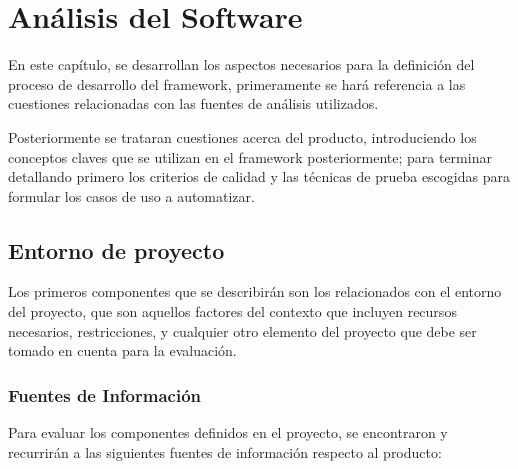 \chapter{Análisis del Software}

En este capítulo, se desarrollan los aspectos necesarios para la definición del
proceso de desarrollo del framework, primeramente se hará referencia a las
cuestiones relacionadas con las fuentes de análisis utilizados.

Posteriormente se trataran cuestiones acerca del producto, introduciendo los
conceptos claves que se utilizan en el framework posteriormente; para terminar
detallando primero los criterios de calidad y las técnicas de prueba escogidas
para formular los casos de uso a automatizar.

\section{Entorno de proyecto}
Los primeros componentes que se describirán son los relacionados con el entorno
del proyecto, que son aquellos factores del contexto que incluyen recursos
necesarios, restricciones, y cualquier otro elemento del proyecto que debe ser
tomado en cuenta para la evaluación.

\subsection{Fuentes de Información}
Para evaluar los componentes definidos en el proyecto, se encontraron
y recurrirán a las siguientes fuentes de información respecto al producto:

